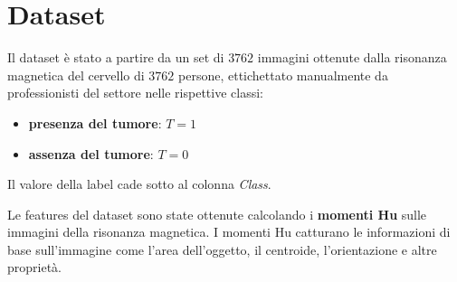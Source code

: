 \chapter{Dataset}
Il dataset è stato a partire da un set di $3762$ immagini ottenute dalla risonanza
magnetica del cervello di $3762$ persone, ettichettato manualmente da professionisti
del settore nelle rispettive classi:
\begin{itemize}
    \item \textbf{presenza del tumore}: $T = 1$
    \item \textbf{assenza del tumore}: $T = 0$
\end{itemize} 
Il valore della label cade sotto al colonna \textit{Class}.

Le features del dataset sono state ottenute calcolando i \textbf{momenti Hu}  sulle 
immagini della risonanza magnetica. I momenti Hu catturano le informazioni di base
sull'immagine come l'area dell'oggetto, il centroide, l'orientazione e altre proprietà.

